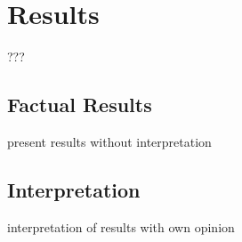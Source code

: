 \section{Results}
???

\subsection{Factual Results}
present results without interpretation
\subsection{Interpretation}
interpretation of results with own opinion

